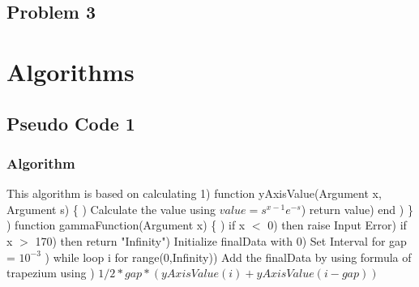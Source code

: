 \documentclass{article}
\begin{document}
\begin{center}
    \section*{Problem 3}
\end{center}

\section{Algorithms}
\subsection{Pseudo Code 1}
\subsubsection{Algorithm}
This algorithm is based on calculating
1) function yAxisValue(Argument x, Argument s) \{ ) \hspace{15pt} Calculate the value using $value = {s^{x - 1} e^{ - s}}$) \hspace{15pt} return value) end ) \}  ) function gammaFunction(Argument x) \{ ) \hspace{15pt} if x $<$ 0) \hspace{35pt} then raise Input Error) \hspace{15pt} if x $>$ 170) \hspace{35pt} then return "Infinity") \hspace{15pt}Initialize finalData with 0) \hspace{15pt}Set Interval for gap = $10 ^ {-3}$ ) \hspace{15pt}while loop i for range(0,Infinity)) \hspace{35pt}Add the finalData by using formula of trapezium using ) \hspace{35pt} \textbf{$1/2*gap*(yAxisValue(i) + yAxisValue(i-gap))$} \newline
\end{document}
